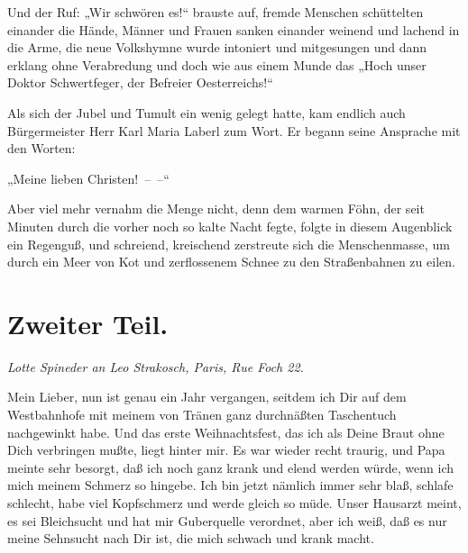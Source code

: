 Und der Ruf: „Wir schwören es!“ brauste auf, fremde Menschen
schüttelten einander die Hände, Männer und Frauen sanken einander
weinend und lachend in die Arme, die neue Volkshymne wurde
intoniert und mitgesungen und dann erklang ohne Verabredung und
doch wie aus einem Munde das „Hoch unser Doktor Schwertfeger, der
Befreier Oesterreichs!“

Als sich der Jubel und Tumult ein wenig gelegt
hatte, kam endlich auch Bürgermeister Herr Karl Maria Laberl zum
Wort. Er begann seine Ansprache mit den Worten:

„Meine lieben Christen!~–~–“

Aber viel mehr vernahm die Menge nicht, denn dem warmen Föhn, der
seit Minuten durch die vorher noch so kalte Nacht fegte, folgte in
diesem Augenblick ein Regenguß, und schreiend, kreischend
zerstreute sich die Menschenmasse, um durch ein Meer von Kot und
zerflossenem Schnee zu den Straßenbahnen zu eilen.

\chapter{Zweiter Teil.}

\begin{center}
\textit{Lotte Spineder an Leo Strakosch, Paris, Rue Foch 22.}

\end{center}
Mein Lieber, nun ist genau ein Jahr vergangen, seitdem ich Dir auf
dem Westbahnhofe mit meinem von Tränen ganz durchnäßten Taschentuch
nachgewinkt habe. Und das erste Weihnachtsfest, das ich als Deine
Braut ohne Dich verbringen mußte, liegt hinter mir. Es war wieder
recht traurig, und Papa meinte sehr besorgt, daß ich noch ganz
krank und elend werden würde, wenn ich mich meinem Schmerz so
hingebe. Ich bin jetzt nämlich immer sehr blaß, schlafe schlecht,
habe viel Kopfschmerz und werde gleich so müde. Unser Hausarzt
meint, es sei Bleichsucht und hat mir Guberquelle verordnet, aber
ich weiß, daß es nur meine Sehnsucht nach Dir ist, die mich schwach
und krank macht.

